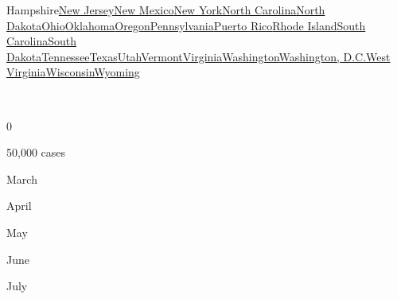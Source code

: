 {Hampshire}\href{https://www.nytimes.com/interactive/2020/us/new-jersey-coronavirus-cases.html}{New
Jersey}\href{https://www.nytimes.com/interactive/2020/us/new-mexico-coronavirus-cases.html}{New
Mexico}\href{https://www.nytimes.com/interactive/2020/us/new-york-coronavirus-cases.html}{New
York}\href{https://www.nytimes.com/interactive/2020/us/north-carolina-coronavirus-cases.html}{North
Carolina}\href{https://www.nytimes.com/interactive/2020/us/north-dakota-coronavirus-cases.html}{North
Dakota}\href{https://www.nytimes.com/interactive/2020/us/ohio-coronavirus-cases.html}{Ohio}\href{https://www.nytimes.com/interactive/2020/us/oklahoma-coronavirus-cases.html}{Oklahoma}\href{https://www.nytimes.com/interactive/2020/us/oregon-coronavirus-cases.html}{Oregon}\href{https://www.nytimes.com/interactive/2020/us/pennsylvania-coronavirus-cases.html}{Pennsylvania}\href{https://www.nytimes.com/interactive/2020/us/puerto-rico-coronavirus-cases.html}{Puerto
Rico}\href{https://www.nytimes.com/interactive/2020/us/rhode-island-coronavirus-cases.html}{Rhode
Island}\href{https://www.nytimes.com/interactive/2020/us/south-carolina-coronavirus-cases.html}{South
Carolina}\href{https://www.nytimes.com/interactive/2020/us/south-dakota-coronavirus-cases.html}{South
Dakota}\href{https://www.nytimes.com/interactive/2020/us/tennessee-coronavirus-cases.html}{Tennessee}\href{https://www.nytimes.com/interactive/2020/us/texas-coronavirus-cases.html}{Texas}\href{https://www.nytimes.com/interactive/2020/us/utah-coronavirus-cases.html}{Utah}\href{https://www.nytimes.com/interactive/2020/us/vermont-coronavirus-cases.html}{Vermont}\href{https://www.nytimes.com/interactive/2020/us/virginia-coronavirus-cases.html}{Virginia}\href{https://www.nytimes.com/interactive/2020/us/washington-coronavirus-cases.html}{Washington}\href{https://www.nytimes.com/interactive/2020/us/washington-dc-coronavirus-cases.html}{Washington,
D.C.}\href{https://www.nytimes.com/interactive/2020/us/west-virginia-coronavirus-cases.html}{West
Virginia}\href{https://www.nytimes.com/interactive/2020/us/wisconsin-coronavirus-cases.html}{Wisconsin}\href{https://www.nytimes.com/interactive/2020/us/wyoming-coronavirus-cases.html}{Wyoming}

~

0

50,000 cases

March

April

May

June

July

